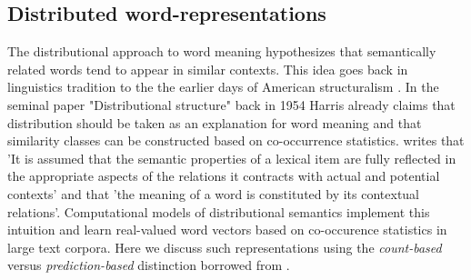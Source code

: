 \subsection{Distributed word-representations}
\label{sec:words}
The distributional approach to word meaning hypothesizes that semantically related words
tend to appear in similar contexts. This idea goes back in linguistics tradition to the the
earlier days of American structuralism \cite{nevin2002legacy}. In the seminal paper
"Distributional structure" \cite{harris1954distributional} back in 1954 Harris already claims
that distribution should be taken as an explanation for word meaning and that similarity classes
can be constructed based on co-occurrence statistics.
\cite{cruse1986lexical} writes that 'It is  assumed  that  the  semantic properties  of
a lexical  item  are  fully  reflected  in  the  appropriate  aspects  of  the  relations
it  contracts  with  actual  and  potential  contexts' and that 'the  meaning  of  a word
is constituted  by  its  contextual  relations'. Computational models of distributional
semantics implement this intuition and learn real-valued word vectors based on co-occurence
statistics in large text corpora. Here we discuss such representations using the \emph{count-based}
versus \emph{prediction-based} distinction borrowed from \cite{baroni2014don}.

